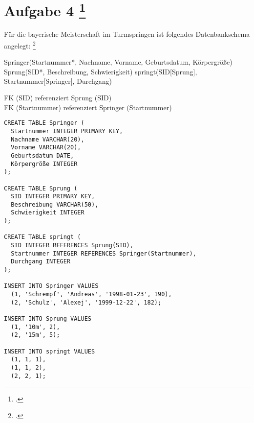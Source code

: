 \documentclass{bschlangaul-aufgabe}
\begin{document}

\section{Aufgabe 4
\footcite[Thema 2 Teilaufgabe 2 Aufgabe 4]{examen:46116:2017:09}}

\noindent
Für die bayerische Meisterschaft im Turmspringen ist folgendes
Datenbankschema angelegt:
\footcite[SQL-Anfragen auf mehreren Tabellen, Aufgabe 4]{db:ab:2}

\begin{liRelationenSchemaFormat}
Springer(Startnummer*, Nachname, Vorname, Geburtsdatum, Körpergröße)
Sprung(SID*, Beschreibung, Schwierigkeit)
springt(SID[Sprung], Startnummer[Springer], Durchgang)
\end{liRelationenSchemaFormat}

\begin{liRmodell}



FK (SID) referenziert Sprung (SID)\\
FK (Startnummer) referenziert Springer (Startnummer)
\end{liRmodell}

\begin{verbatim}
CREATE TABLE Springer (
  Startnummer INTEGER PRIMARY KEY,
  Nachname VARCHAR(20),
  Vorname VARCHAR(20),
  Geburtsdatum DATE,
  Körpergröße INTEGER
);

CREATE TABLE Sprung (
  SID INTEGER PRIMARY KEY,
  Beschreibung VARCHAR(50),
  Schwierigkeit INTEGER
);

CREATE TABLE springt (
  SID INTEGER REFERENCES Sprung(SID),
  Startnummer INTEGER REFERENCES Springer(Startnummer),
  Durchgang INTEGER
);

INSERT INTO Springer VALUES
  (1, 'Schrempf', 'Andreas', '1998-01-23', 190),
  (2, 'Schulz', 'Alexej', '1999-12-22', 182);

INSERT INTO Sprung VALUES
  (1, '10m', 2),
  (2, '15m', 5);

INSERT INTO springt VALUES
  (1, 1, 1),
  (1, 1, 2),
  (2, 2, 1);
\end{verbatim}
\end{document}
